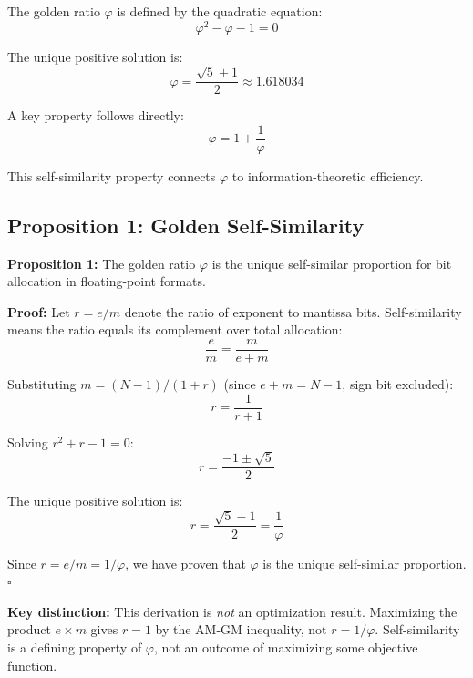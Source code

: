 \documentclass{article}
\begin{document}
The golden ratio $\varphi$ is defined by the quadratic equation:
\begin{equation}
\varphi^2 - \varphi - 1 = 0
\end{equation}

The unique positive solution is:
\begin{equation}
\varphi = \frac{\sqrt{5} + 1}{2} \approx 1.618034
\end{equation}

A key property follows directly:
\begin{equation}
\varphi = 1 + \frac{1}{\varphi}
\end{equation}

This self-similarity property connects $\varphi$ to information-theoretic efficiency.

\subsection{Proposition 1: Golden Self-Similarity}

\textbf{Proposition 1:} The golden ratio $\varphi$ is the unique self-similar proportion for bit allocation in floating-point formats.

\textbf{Proof:} Let $r = e/m$ denote the ratio of exponent to mantissa bits. Self-similarity means the ratio equals its complement over total allocation:
\begin{equation}
\frac{e}{m} = \frac{m}{e + m}
\end{equation}

Substituting $m = (N-1)/(1+r)$ (since $e + m = N-1$, sign bit excluded):
\begin{equation}
r = \frac{1}{r + 1}
\end{equation}

Solving $r^2 + r - 1 = 0$:
\begin{equation}
r = \frac{-1 \pm \sqrt{5}}{2}
\end{equation}

The unique positive solution is:
\begin{equation}
r = \frac{\sqrt{5} - 1}{2} = \frac{1}{\varphi}
\end{equation}

Since $r = e/m = 1/\varphi$, we have proven that $\varphi$ is the unique self-similar proportion. \hfill $\square$

\textbf{Key distinction:} This derivation is \textit{not} an optimization result. Maximizing the product $e \times m$ gives $r = 1$ by the AM-GM inequality, not $r = 1/\varphi$. Self-similarity is a defining property of $\varphi$, not an outcome of maximizing some objective function.
\end{document}
